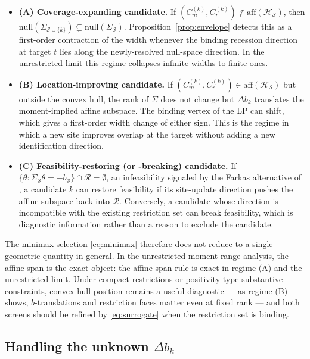 \begin{itemize}
\item \textbf{(A) Coverage-expanding candidate.} If $(C_m^{(k)}, C_r^{(k)})
  \notin \mathrm{aff}(\mathcal{H}_\mathcal{S})$, then
  $\mathrm{null}(\Sigma_{\mathcal{S}\cup\{k\}}) \subsetneq
  \mathrm{null}(\Sigma_\mathcal{S})$. Proposition~\ref{prop:envelope} detects
  this as a first-order contraction of the width whenever the binding recession
  direction at target $t$ lies along the newly-resolved null-space direction. In
  the unrestricted limit this regime collapses infinite widths to finite
  ones.

\item \textbf{(B) Location-improving candidate.} If $(C_m^{(k)}, C_r^{(k)}) \in
  \mathrm{aff}(\mathcal{H}_\mathcal{S})$ but outside the convex hull, the rank of
  $\Sigma$ does not change but $\Delta b_k$ translates the moment-implied affine
  subspace. The binding vertex of the LP can shift, which gives a first-order
  width change of either sign. This is the regime in which a new site
  improves
  overlap at the target without adding a new identification direction.

\item \textbf{(C) Feasibility-restoring (or -breaking) candidate.} If $\{\theta
  : \Sigma_\mathcal{S}\theta = -b_\mathcal{S}\}\cap \mathcal{R} = \emptyset$, an
  infeasibility signaled by the Farkas alternative of \citet[\S4.4 (c)]{boyarsky2026}, a candidate $k$ can restore feasibility if its site-update
  direction pushes the affine subspace back into $\mathcal{R}$.
  Conversely, a candidate whose direction is incompatible with the existing
  restriction set can break feasibility, which is diagnostic information rather
  than a reason to exclude the candidate.
\end{itemize}

The minimax selection \eqref{eq:minimax} therefore does not reduce to a single
geometric quantity in general. In the unrestricted moment-range analysis, the
affine span is the exact object: the affine-span rule is exact in regime (A) and
the unrestricted limit. Under compact restrictions or positivity-type
substantive constraints, convex-hull position remains a useful diagnostic
--- as regime (B) shows, $b$-translations and restriction faces matter even at
fixed rank --- and both screens should be refined by \eqref{eq:surrogate} when
the restriction set is binding.

\subsection{Handling the unknown \texorpdfstring{$\Delta b_k$}{Delta b\_k}}
\label{sec:unknown-b}

